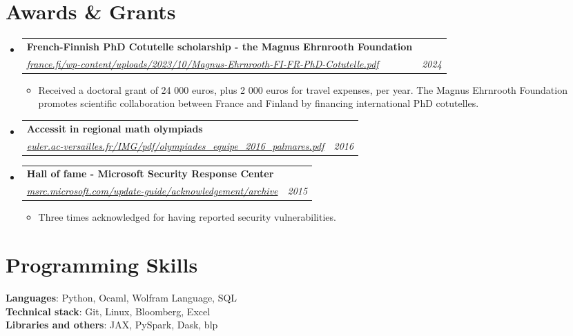 \documentclass[letterpaper,10pt]{article}
\makeatletter
\newcommand{\up}[1]{\textsuperscript{#1}}
\newcommand{\resumeItem}[1]{
    \item\small{
            {#1 \vspace{-2pt}}
    }
}
\newcommand{\resumeSubheading}[4]{
    \vspace{-2pt}\item
    \begin{tabular*}{0.97\textwidth}[t]{l@{\extracolsep{\fill}}r}
        \textbf{#1}       & #2                 \\
        \textit{\small#3} & \textit{\small #4} \\
    \end{tabular*}\vspace{-7pt}
}
\newcommand{\resumeSubHeadingListStart}{\begin{itemize}[leftmargin=0.15in, label={}]}
\newcommand{\resumeSubHeadingListEnd}{\end{itemize}}
\newcommand{\resumeItemListStart}{\begin{itemize}}
\newcommand{\resumeItemListEnd}{\end{itemize}\vspace{-5pt}}
\makeatother
\begin{document}
\section{Awards \& Grants}
\resumeSubHeadingListStart
\resumeSubheading{French-Finnish PhD Cotutelle scholarship - the Magnus Ehrnrooth Foundation
}{}{\href{https://www.france.fi/wp-content/uploads/2023/10/Magnus-Ehrnrooth-FI-FR-PhD-Cotutelle.pdf}{france.fi/wp-content/uploads/2023/10/Magnus-Ehrnrooth-FI-FR-PhD-Cotutelle.pdf}}{2024}
\resumeItemListStart
\resumeItem{Received a doctoral grant of 24 000 euros, plus 2 000 euros for travel expenses, per year. The Magnus Ehrnrooth Foundation promotes scientific collaboration between France and Finland by financing international PhD cotutelles.}
\resumeItemListEnd
\resumeSubheading
{Accessit in regional math olympiads}{}{\href{http://euler.ac-versailles.fr/IMG/pdf/olympiades_equipe_2016_palmares.pdf}{euler.ac-versailles.fr/IMG/pdf/olympiades\_equipe\_2016\_palmares.pdf}}{2016}
\resumeSubheading
{Hall of fame - Microsoft Security Response Center}{}{\href{https://msrc.microsoft.com/update-guide/acknowledgement/archive}{msrc.microsoft.com/update-guide/acknowledgement/archive}}{2015}
\resumeItemListStart
\resumeItem{Three times acknowledged for having reported security vulnerabilities.}
\resumeItemListEnd
\resumeSubHeadingListEnd
\section{Programming Skills}
\begin{itemize}[leftmargin=0.15in, label={}]
\small{\item{
\textbf{Languages}{: Python, Ocaml, Wolfram Language, SQL} \\
\textbf{Technical stack}{: Git, Linux, Bloomberg, Excel}\\
\textbf{Libraries and others}{: JAX, PySpark, Dask, blp}

}}
\end{itemize}
\end{document}
